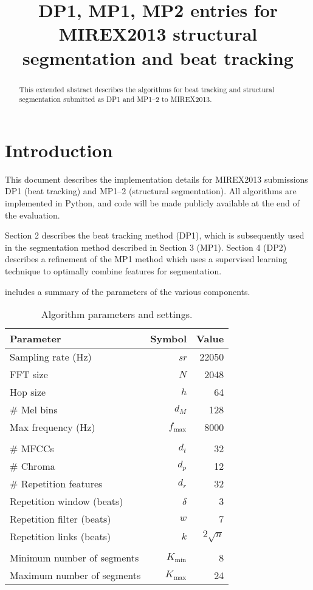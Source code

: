 \documentclass{article}
\title{DP1, MP1, MP2 entries for MIREX2013 structural segmentation and beat tracking}
\begin{document}
%
\maketitle
%
\begin{abstract}
This extended abstract describes the algorithms for beat tracking and structural segmentation submitted as DP1 and MP1--2 to MIREX2013.
\end{abstract}
%
\section{Introduction}
\label{sec:introduction}

This document describes the implementation details for MIREX2013 submissions DP1 (beat tracking) and MP1--2
(structural segmentation).  All algorithms are implemented in Python, and code will be made publicly available
at the end of the evaluation.

Section 2 describes the beat tracking method (DP1), which is subsequently used in the segmentation method 
described in Section 3 (MP1).  Section 4 (DP2) describes a refinement of the MP1 method which uses a supervised
learning technique to optimally combine features for segmentation.

 includes a summary of the parameters of the various components.

\begin{table}
\caption{Algorithm parameters and settings.\label{tab:parameters}}
\centering\begin{tabular}{lrr}
\toprule%
Parameter           & Symbol    & Value\\
\hline
Sampling rate (Hz)  & \em{sr}   & 22050\\
FFT size            & $N$       & 2048\\
Hop size            & $h$       & 64\\
\# Mel bins         & $d_M$       & 128\\
Max frequency (Hz)  & $f_{\max}$  & 8000\\
\\
\# MFCCs            & $d_t$     &   32\\
\# Chroma           & $d_p$     &   12\\
\# Repetition features      & $d_r$     &   32\\
Repetition window (beats)   & $\delta$  &   3\\
Repetition filter (beats)   & $w$       &   7\\
Repetition links (beats)    & $k$       &   $2\sqrt{n}$\\
\\
Minimum number of segments  & $K_{\min}$ & 8\\
Maximum number of segments  & $K_{\max}$ & 24\\
\bottomrule%
\end{tabular}
\end{table}
\end{document}

